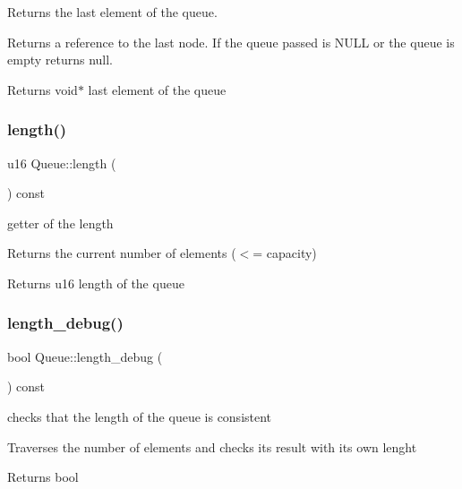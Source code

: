 Returns the last element of the queue. 

Returns a reference to the last node. If the queue passed is N\+U\+LL or the queue is empty returns null.

\begin{DoxyReturn}{Returns}
void$\ast$ last element of the queue 
\end{DoxyReturn}
\mbox{\label{class_queue_a4a4164d32375aa63b92d2b86963f0cd8}} 
\subsubsection{\texorpdfstring{length()}{length()}}
{\footnotesize\ttfamily u16 Queue\+::length (\begin{DoxyParamCaption}{ }\end{DoxyParamCaption}) const}



getter of the length 

Returns the current number of elements ($<$= capacity)

\begin{DoxyReturn}{Returns}
u16 length of the queue 
\end{DoxyReturn}
\mbox{\label{class_queue_a3d8fda7e63d8cf4117cdf1cdc1a144c1}} 
\subsubsection{\texorpdfstring{length\+\_\+debug()}{length\_debug()}}
{\footnotesize\ttfamily bool Queue\+::length\+\_\+debug (\begin{DoxyParamCaption}{ }\end{DoxyParamCaption}) const}



checks that the length of the queue is consistent 

Traverses the number of elements and checks its result with its own lenght

\begin{DoxyReturn}{Returns}
bool 
\end{DoxyReturn}
\mbox{\label{class_queue_a5e5f86661785506b5de5f3e119ff871e}} 
